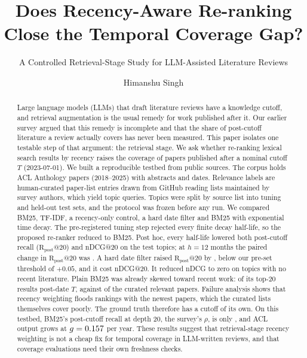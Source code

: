 \documentclass[acmsmall]{acmart}
\makeatletter
\newcommand{\Rpost}{\mathrm{R}_{\text{post}}@20}
\makeatother
\begin{document}
\title{Does Recency-Aware Re-ranking Close the Temporal Coverage Gap?}
\subtitle{A Controlled Retrieval-Stage Study for LLM-Assisted Literature Reviews}

\author{Himanshu Singh}

\begin{abstract}
Large language models (LLMs) that draft literature reviews have a knowledge cutoff, and retrieval augmentation is the usual remedy for work published after it. Our earlier survey argued that this remedy is incomplete and that the share of post-cutoff literature a review actually covers has never been measured. This paper isolates one testable step of that argument: the retrieval stage. We ask whether re-ranking lexical search results by recency raises the coverage of papers published after a nominal cutoff $T$ (2023-07-01). We built a reproducible testbed from public sources. The corpus holds \NDocs{} ACL Anthology papers (2018--2025) with abstracts and dates. Relevance labels are \NJudg{} human-curated paper-list entries drawn from \NLists{} GitHub reading lists maintained by survey authors, which yield \NQueries{} topic queries. Topics were split by source list into tuning and held-out test sets, and the protocol was frozen before any run. We compared BM25, TF-IDF, a recency-only control, a hard date filter and BM25 with exponential time decay. The pre-registered tuning step rejected every finite decay half-life, so the proposed re-ranker reduced to BM25. Post hoc, every half-life lowered both post-cutoff recall ($\Rpost$) and nDCG@20 on the test topics; at $h=12$ months the paired change in $\Rpost$ was \DecdRpost{} \DecdRpostCI. A hard date filter raised $\Rpost$ by \DFdRpost{} \DFdRpostCI, below our pre-set threshold of $+0.05$, and it cost \DFdnDCG{} nDCG@20. It reduced nDCG to zero on topics with no recent literature. Plain BM25 was already skewed toward recent work: \BMPostShare{} of its top-20 results post-date $T$, against \RelPostShare{} of the curated relevant papers. Failure analysis shows that recency weighting floods rankings with the newest papers, which the curated lists themselves cover poorly. The ground truth therefore has a cutoff of its own. On this testbed, BM25's post-cutoff recall at depth 20, the survey's $\rho$, is only \RhoTwenty, and ACL output grows at $g=0.157$ per year. These results suggest that retrieval-stage recency weighting is not a cheap fix for temporal coverage in LLM-written reviews, and that coverage evaluations need their own freshness checks.
\end{abstract}
\end{document}
